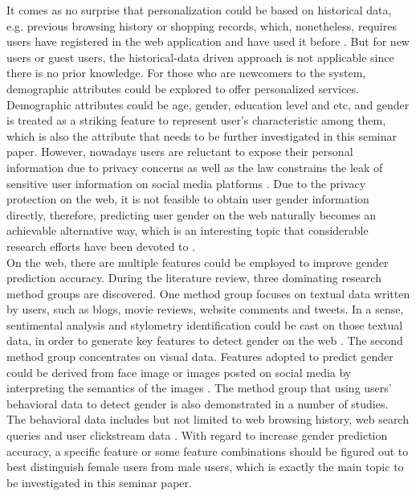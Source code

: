 \documentclass[runningheads]{llncs}
\begin{document}
	It comes as no surprise that personalization could be based on historical data, e.g. previous browsing history or shopping records, which, nonetheless, requires users have registered in the web application and have used it before \cite{duong2016customer}. But for new users or guest users, the historical-data driven approach is not applicable since there is no prior knowledge. For those who are newcomers to the system, demographic attributes could be explored to offer personalized services. Demographic attributes could be age, gender, education level and etc, and gender is treated as a striking feature to represent user’s characteristic among them, which is also the attribute that needs to be further investigated in this seminar paper. However, nowadays users are reluctant to expose their personal information due to privacy concerns as well as the law constrains the leak of sensitive user information on social media platforms \cite{zheleva2009join}. Due to the privacy protection on the web, it is not feasible to obtain user gender information directly, therefore, predicting user gender on the web naturally becomes an achievable alternative way, which is an interesting topic that considerable research efforts have been devoted to \cite{phuong2014gender}. \\
	
	On the web, there are multiple features could be employed to improve gender prediction accuracy. During the literature review, three dominating research method groups are discovered. One method group focuses on textual data written by users, such as blogs, movie reviews, website comments and tweets.  In a sense, sentimental analysis and stylometry identification could be cast on those textual data, in order to generate key features to detect gender on the web \cite{phuong2014gender}. The second method group concentrates on visual data. Features adopted to predict gender could be derived from face image or images posted on social media by interpreting the semantics of the images \cite{merler2015you}. The method group that using users’ behavioral data to detect gender is also demonstrated in a number of studies. The behavioral data includes but not limited to web browsing history, web search queries and user clickstream data \cite{hu2007demographic}. With regard to increase gender prediction accuracy, a specific feature or some feature combinations should be figured out to best distinguish female users from male users, which is exactly the main topic to be investigated in this seminar paper. \\
	
\end{document}
